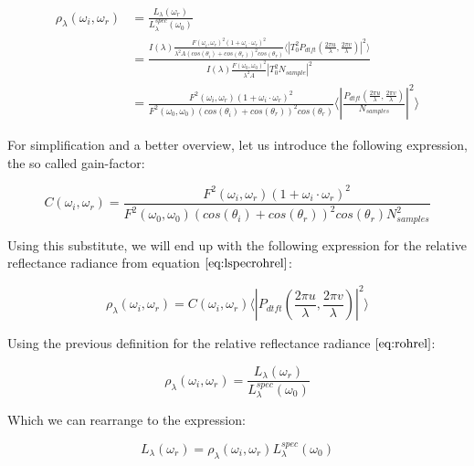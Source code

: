\begin{align}
\rho_\lambda(\omega_i,\omega_r)
& = \frac{L_\lambda(\omega_r)}{L_\lambda^{spec}(\omega_0)} \nonumber \\
& = \frac{I(\lambda) \frac{F(\omega_i, \omega_r)^2 (1 + \omega_i \cdot \omega_r)^2}{\lambda^2 A (cos(\theta_i)+cos(\theta_r))^2 cos(\theta_r)} \langle \left|T_0^2 P_{dtft}(\frac{2\pi u}{\lambda}, \frac{2\pi v}{\lambda}) \right|^2\rangle}{I(\lambda) \frac{F(\omega_0, \omega_0)^2}{\lambda^2 A}\left| T_0^2 N_{sample} \right|^2 } \nonumber \\
& = \frac{F^2(\omega_i,\omega_r)(1 + \omega_i \cdot \omega_r)^2}{F^2(\omega_0,\omega_0)(cos(\theta_i)+cos(\theta_r))^2 cos(\theta_r)} \langle \left|\frac{P_{dtft}(\frac{2\pi u}{\lambda}, \frac{2\pi v}{\lambda})}{N_{samples}}\right|^2\rangle
\label{eq:lspecrohrel}
\end{align}

For simplification and a better overview, let us introduce the following expression, the so called gain-factor:

\begin{equation} 
    C(\omega_i,\omega_r) = \frac{F^2(\omega_i,\omega_r)(1 + \omega_i \cdot \omega_r)^2}{F^2(\omega_0,\omega_0)(cos(\theta_i)+cos(\theta_r))^2 cos(\theta_r) N_{samples}^2}
\label{eq:cfact}
\end{equation}

Using this substitute, we will end up with the following expression for the relative reflectance radiance from equation $\ref{eq:lspecrohrel}$:

\begin{equation}
\rho_\lambda(\omega_i,\omega_r) =  C(\omega_i,\omega_r) \langle \left|P_{dtft}(\frac{2\pi u}{\lambda}, \frac{2\pi v}{\lambda})\right|^2\rangle
\label{eq:cpterm}
\end{equation}

Using the previous definition for the relative reflectance radiance $\ref{eq:rohrel}$:

\begin{equation}
 \rho_\lambda(\omega_i,\omega_r) = \frac{L_\lambda(\omega_r)}{L_\lambda^{spec}(\omega_0)} 
\end{equation}

Which we can rearrange to the expression: 

\begin{equation}
L_\lambda(\omega_r) = \rho_\lambda(\omega_i,\omega_r)L_\lambda^{spec}(\omega_0)
\label{eq:radianceomegarspec}
\end{equation}

